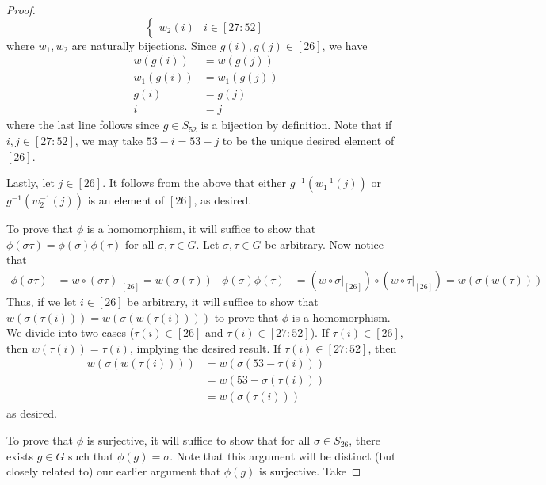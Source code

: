 \documentclass[../psets.tex]{subfiles}
\begin{document}
\begin{enumerate}
\begin{enumerate}
\begin{proof}
\begin{equation*}
\begin{cases}
                    w_2(i) & i\in[27:52]
                \end{cases}
            \end{equation*}
            where $w_1,w_2$ are naturally bijections. Since $g(i),g(j)\in[26]$, we have
            \begin{align*}
                w(g(i)) &= w(g(j))\\
                w_1(g(i)) &= w_1(g(j))\\
                g(i) &= g(j)\\
                i &= j
            \end{align*}
            where the last line follows since $g\in S_{52}$ is a bijection by definition. Note that if $i,j\in[27:52]$, we may take $53-i=53-j$ to be the unique desired element of $[26]$.\par
            Lastly, let $j\in[26]$. It follows from the above that either $g^{-1}(w_1^{-1}(j))$ or $g^{-1}(w_2^{-1}(j))$ is an element of $[26]$, as desired.\par\smallskip
            To prove that $\phi$ is a homomorphism, it will suffice to show that $\phi(\sigma\tau)=\phi(\sigma)\phi(\tau)$ for all $\sigma,\tau\in G$. Let $\sigma,\tau\in G$ be arbitrary. Now notice that
            \begin{align*}
                \phi(\sigma\tau) &= w\circ(\sigma\tau)|_{[26]}
                = w(\sigma(\tau))&
                \phi(\sigma)\phi(\tau) &= (w\circ\sigma|_{[26]})\circ(w\circ\tau|_{[26]})
                = w(\sigma(w(\tau)))
            \end{align*}
            Thus, if we let $i\in[26]$ be arbitrary, it will suffice to show that $w(\sigma(\tau(i)))=w(\sigma(w(\tau(i))))$ to prove that $\phi$ is a homomorphism. We divide into two cases ($\tau(i)\in[26]$ and $\tau(i)\in[27:52]$). If $\tau(i)\in[26]$, then $w(\tau(i))=\tau(i)$, implying the desired result. If $\tau(i)\in[27:52]$, then
            \begin{align*}
                w(\sigma(w(\tau(i)))) &= w(\sigma(53-\tau(i)))\tag*{Definition of $w$}\\
                &= w(53-\sigma(\tau(i)))\tag*{Lemma 1}\\
                &= w(\sigma(\tau(i)))\tag*{Lemma 2}
            \end{align*}
            as desired.\par\smallskip
            To prove that $\phi$ is surjective, it will suffice to show that for all $\sigma\in S_{26}$, there exists $g\in G$ such that $\phi(g)=\sigma$. Note that this argument will be distinct (but closely related to) our earlier argument that $\phi(g)$ is surjective. Take

\end{proof}
\end{enumerate}
\end{enumerate}
\end{document}

